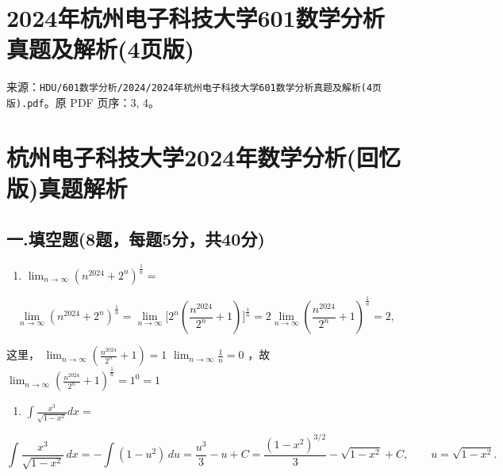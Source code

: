 \documentclass[11pt,fontset=fandol]{ctexart}
\providecommand{\tightlist}{\setlength{\itemsep}{0pt}\setlength{\parskip}{0pt}}
\begin{document}
\section{2024年杭州电子科技大学601数学分析真题及解析(4页版)}\label{ux5e74ux676dux5ddeux7535ux5b50ux79d1ux6280ux5927ux5b66601ux6570ux5b66ux5206ux6790ux771fux9898ux53caux89e3ux67904ux9875ux7248}

来源：\texttt{HDU/601数学分析/2024/2024年杭州电子科技大学601数学分析真题及解析(4页版).pdf}。原
PDF 页序：3, 4。

\section{杭州电子科技大学2024年数学分析(回忆版)真题解析}\label{ux676dux5ddeux7535ux5b50ux79d1ux6280ux5927ux5b662024ux5e74ux6570ux5b66ux5206ux6790ux56deux5fc6ux7248ux771fux9898ux89e3ux6790}

\subsection{一.填空题(8题，每题5分，共40分)}\label{ux4e00.ux586bux7a7aux98988ux9898ux6bcfux98985ux5206ux517140ux5206}

\begin{enumerate}
\def\labelenumi{\arabic{enumi}.}
\tightlist
\item
  \(\lim _ { n \to \infty } ( n ^ { 2 0 2 4 } + 2 ^ { n } ) ^ { \frac { 1 } { n } } =\)
\end{enumerate}

\[
\lim _ { n \to \infty } ( n ^ { 2 0 2 4 } + 2 ^ { n } ) ^ { \frac { 1 } { n } } = \lim _ { n \to \infty } \Biggl [ 2 ^ { n } ( { \frac { n ^ { 2 0 2 4 } } { 2 ^ { n } } } + 1 ) \Biggr ] ^ { \frac { 1 } { n } } = 2 \lim _ { n \to \infty } ( { \frac { n ^ { 2 0 2 4 } } { 2 ^ { n } } } + 1 ) ^ { \frac { 1 } { n } } = 2 ,
\]

这里，
\(\lim _ { n \to \infty } ( { \frac { n ^ { 2 0 2 4 } } { 2 ^ { n } } } + 1 ) = 1\)
\(\lim _ { n \to \infty } { \frac { 1 } { n } } = 0\) ，故
\(\lim _ { n \to \infty } ( { \frac { n ^ { 2 0 2 4 } } { 2 ^ { n } } } + 1 ) ^ { \frac { 1 } { n } } = 1 ^ { 0 } = 1\)

\begin{enumerate}
\def\labelenumi{\arabic{enumi}.}
\setcounter{enumi}{1}
\tightlist
\item
  \(\int \frac { x ^ { 3 } } { \sqrt { 1 - x ^ { 2 } } } d x =\)
\end{enumerate}

\[
\int \frac{x^3}{\sqrt{1-x^2}}\,dx
= -\int (1-u^2)\,du
= \frac{u^3}{3}-u+C
= \frac{(1-x^2)^{3/2}}{3}-\sqrt{1-x^2}+C,
\qquad u=\sqrt{1-x^2}.
\]
\end{document}
